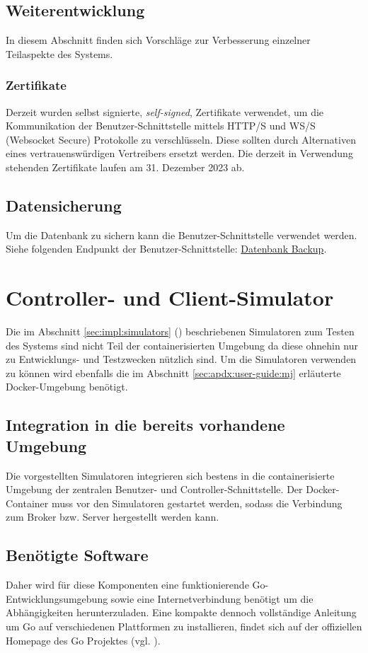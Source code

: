 \subsection{Weiterentwicklung}
In diesem Abschnitt finden sich Vorschläge zur Verbesserung einzelner Teilaspekte des Systems. 

\subsubsection{Zertifikate}
Derzeit wurden selbst signierte, \textit{self-signed}, Zertifikate verwendet, um die Kommunikation der Benutzer-Schnittstelle mittels HTTP/S und WS/S (Websocket Secure) Protokolle zu verschlüsseln. Diese sollten durch Alternativen eines vertrauenswürdigen Vertreibers ersetzt werden. Die derzeit in Verwendung stehenden Zertifikate laufen am 31. Dezember 2023 ab.

\subsection{Datensicherung}
Um die Datenbank zu sichern kann die Benutzer-Schnittstelle verwendet werden. Siehe folgenden Endpunkt der Benutzer-Schnittstelle: \hyperref[sec:apdx:db:dump]{Datenbank Backup}.%

\section{Controller- und Client-Simulator \MjAnnotation{}}
Die im Abschnitt \ref{sec:impl:simulators} () beschriebenen Simulatoren zum Testen des Systems sind nicht Teil der containerisierten Umgebung da diese ohnehin nur zu Entwicklungs- und Testzwecken nützlich sind. Um die Simulatoren verwenden zu können wird ebenfalls die im Abschnitt \ref{sec:apdx:user-guide:mj} erläuterte Docker-Umgebung benötigt. 

\subsection{Integration in die bereits vorhandene Umgebung}
Die vorgestellten Simulatoren integrieren sich bestens in die containerisierte Umgebung der zentralen Benutzer- und Controller-Schnittstelle. Der Docker-Container muss vor den Simulatoren gestartet werden, sodass die Verbindung zum Broker bzw. Server hergestellt werden kann. 

\subsection{Benötigte Software}
Daher wird für diese Komponenten eine funktionierende Go-Entwicklungsumgebung sowie eine Internetverbindung benötigt um die Abhängigkeiten herunterzuladen. Eine kompakte dennoch vollständige Anleitung um Go auf verschiedenen Plattformen zu installieren, findet sich auf der offiziellen Homepage des Go Projektes (vgl. \cite{go:install}).

